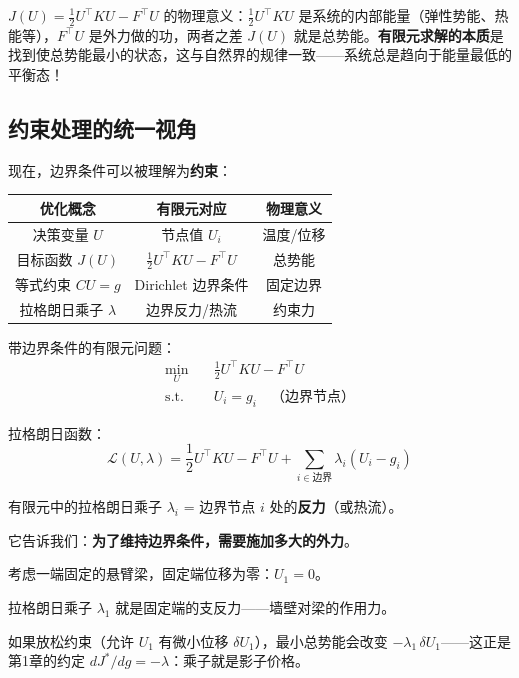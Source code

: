 \begin{physicalmeaning}
$J(U) = \frac{1}{2}U^\top KU - F^\top U$ 的物理意义：$\frac{1}{2}U^\top KU$ 是系统的内部能量（弹性势能、热能等），$F^\top U$ 是外力做的功，两者之差 $J(U)$ 就是总势能。\textbf{有限元求解的本质}是找到使总势能最小的状态，这与自然界的规律一致——系统总是趋向于能量最低的平衡态！
\end{physicalmeaning}

\subsection{约束处理的统一视角}

现在，边界条件可以被理解为\textbf{约束}：

\begin{center}
\renewcommand{\arraystretch}{1.5}
\begin{tabular}{c|c|c}
\toprule
\textbf{优化概念} & \textbf{有限元对应} & \textbf{物理意义} \\
\midrule
决策变量 $U$ & 节点值 $U_i$ & 温度/位移 \\
目标函数 $J(U)$ & $\frac{1}{2}U^\top KU - F^\top U$ & 总势能 \\
等式约束 $CU = g$ & Dirichlet 边界条件 & 固定边界 \\
拉格朗日乘子 $\lambda$ & 边界反力/热流 & 约束力 \\
\bottomrule
\end{tabular}
\end{center}

带边界条件的有限元问题：
\begin{align}
\min_U \quad & \frac{1}{2}U^\top K U - F^\top U \\
\text{s.t.} \quad & U_i = g_i \quad \text{（边界节点）}
\end{align}

拉格朗日函数：
\begin{equation}
\mathcal{L}(U, \lambda) = \frac{1}{2}U^\top K U - F^\top U + \sum_{i \in \text{边界}} \lambda_i (U_i - g_i)
\end{equation}

\begin{keytheorem}[title=乘子的物理意义]
有限元中的拉格朗日乘子 $\lambda_i$ = 边界节点 $i$ 处的\textbf{反力}（或热流）。

它告诉我们：\textbf{为了维持边界条件，需要施加多大的外力}。
\end{keytheorem}

\begin{example}[悬臂梁]
考虑一端固定的悬臂梁，固定端位移为零：$U_1 = 0$。

拉格朗日乘子 $\lambda_1$ 就是固定端的支反力——墙壁对梁的作用力。

如果放松约束（允许 $U_1$ 有微小位移 $\delta U_1$），最小总势能会改变 $-\lambda_1\, \delta U_1$——这正是第1章的约定 $dJ^*/dg = -\lambda$：乘子就是影子价格。
\end{example}

